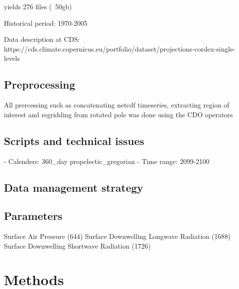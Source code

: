 \documentclass[hess, manuscript]{copernicus}
\begin{document}



yields 276 files (~50gb)

Historical period: 1970-2005

Data description at CDS:
https://cds.climate.copernicus.eu/portfolio/dataset/projections-cordex-single-levels

\subsection{Preprocessing}
All prercessing such as concatenating netcdf timeseries, extracting region of interest and regridding from rotated pole was done using the CDO operators
\subsection{Scripts and technical issues}


- Calenders: 360\_day propelectic\_gregorian
- Time range: 2099-2100

\subsection{Data management strategy}

\subsection{Parameters}
Surface Air Pressure (644)
 Surface Downwelling Longwave Radiation (1688)
 Surface Downwelling Shortwave Radiation (1726)
 





\section{Methods}
\end{document}
